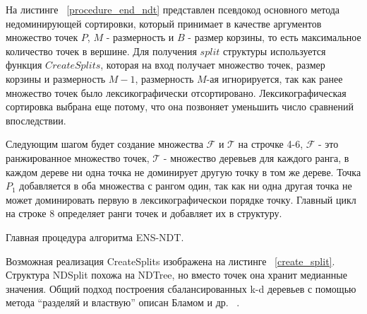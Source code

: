 На листинге ~\ref{procedure_end_ndt} представлен псевдокод основного метода недоминирующей сортировки, который принимает в качестве аргументов множество точек $P$, $M$ - размерность и $B$ - размер корзины, то есть максимальное количество точек в вершине. Для получения $split$ структуры используется функция $CreateSplits$, которая на вход получает множество точек, размер корзины и размерность $M-1$, размерность $M$-ая игнорируется, так как ранее множество точек было лексикографически отсортировано. Лексикографическая сортировка выбрана еще потому, что она позвоняет уменьшить число сравнений впоследствии.

Следующим шагом будет создание множества $\mathcal{F}$ и $\mathcal{T}$ на строчке 4-6, $\mathcal{F}$ - это ранжированное множество точек, $\mathcal{T}$ - множество деревьев для каждого ранга, в каждом дереве ни одна точка не доминирует другую точку в том же дереве. Точка $P_1$ добавляется в оба множества с рангом один, так как ни одна другая точка не может доминировать первую в лексикографическои порядке точку. Главный цикл на строке 8 определяет ранги точек и добавляет их в структуру.

\begin{algorithm}
\begin{algorithmic}[1]
            \EndIf
        \EndIf
    \EndFor
\EndProcedure
\end{algorithmic}
\caption{Главная процедура алгоритма ENS-NDT.}
\label{procedure_end_ndt}
\end{algorithm}

Возможная реализация CreateSplits изображена на листинге ~\ref{create_split}. Структура NDSplit похожа на NDTree, но вместо точек она хранит медианные значения. Общий подход построения сбалансированных k-d деревьев с помощью метода ``разделяй и властвую'' описан Бламом и др. ~\cite{Blum}.

